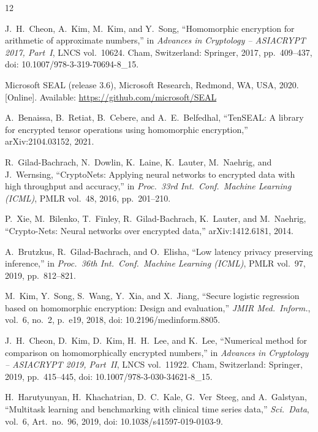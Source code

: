 \documentclass[conference]{IEEEtran}
\begin{document}

\begin{thebibliography}{12}

J.~H.~Cheon, A.~Kim, M.~Kim, and Y.~Song, ``Homomorphic encryption for arithmetic of approximate numbers,'' in \textit{Advances in Cryptology -- ASIACRYPT 2017, Part~I}, LNCS vol.~10624. Cham, Switzerland: Springer, 2017, pp.~409--437, doi: 10.1007/978-3-319-70694-8\_15.

Microsoft SEAL (release 3.6), Microsoft Research, Redmond, WA, USA, 2020. [Online]. Available: \url{https://github.com/microsoft/SEAL}

A.~Benaissa, B.~Retiat, B.~Cebere, and A.~E.~Belfedhal, ``TenSEAL: A library for encrypted tensor operations using homomorphic encryption,'' arXiv:2104.03152, 2021.

R.~Gilad-Bachrach, N.~Dowlin, K.~Laine, K.~Lauter, M.~Naehrig, and J.~Wernsing, ``CryptoNets: Applying neural networks to encrypted data with high throughput and accuracy,'' in \textit{Proc.\ 33rd Int.\ Conf.\ Machine Learning (ICML)}, PMLR vol.~48, 2016, pp.~201--210.

P.~Xie, M.~Bilenko, T.~Finley, R.~Gilad-Bachrach, K.~Lauter, and M.~Naehrig, ``Crypto-Nets: Neural networks over encrypted data,'' arXiv:1412.6181, 2014.

A.~Brutzkus, R.~Gilad-Bachrach, and O.~Elisha, ``Low latency privacy preserving inference,'' in \textit{Proc.\ 36th Int.\ Conf.\ Machine Learning (ICML)}, PMLR vol.~97, 2019, pp.~812--821.

M.~Kim, Y.~Song, S.~Wang, Y.~Xia, and X.~Jiang, ``Secure logistic regression based on homomorphic encryption: Design and evaluation,'' \textit{JMIR Med.\ Inform.}, vol.~6, no.~2, p.~e19, 2018, doi: 10.2196/medinform.8805.

J.~H.~Cheon, D.~Kim, D.~Kim, H.~H.~Lee, and K.~Lee, ``Numerical method for comparison on homomorphically encrypted numbers,'' in \textit{Advances in Cryptology -- ASIACRYPT 2019, Part~II}, LNCS vol.~11922. Cham, Switzerland: Springer, 2019, pp.~415--445, doi: 10.1007/978-3-030-34621-8\_15.

H.~Harutyunyan, H.~Khachatrian, D.~C.~Kale, G.~Ver~Steeg, and A.~Galstyan, ``Multitask learning and benchmarking with clinical time series data,'' \textit{Sci.\ Data}, vol.~6, Art.~no.~96, 2019, doi: 10.1038/s41597-019-0103-9.


\end{thebibliography}
\end{document}
